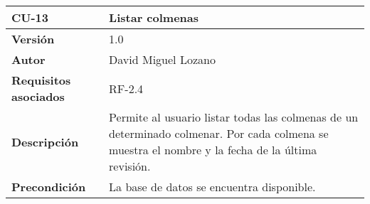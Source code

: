 \begin{longtable}[H]{@{}ll@{}}
\toprule
\begin{minipage}[b]{0.26\columnwidth}\raggedright\strut
\textbf{CU-13}\strut
\end{minipage} & \begin{minipage}[b]{0.68\columnwidth}\raggedright\strut
\textbf{Listar colmenas}\strut
\end{minipage}\tabularnewline
\midrule
\endhead
\begin{minipage}[t]{0.26\columnwidth}\raggedright\strut
\textbf{Versión}\strut
\end{minipage} & \begin{minipage}[t]{0.68\columnwidth}\raggedright\strut
1.0\strut
\end{minipage}\tabularnewline
\begin{minipage}[t]{0.26\columnwidth}\raggedright\strut
\textbf{Autor}\strut
\end{minipage} & \begin{minipage}[t]{0.68\columnwidth}\raggedright\strut
David Miguel Lozano\strut
\end{minipage}\tabularnewline
\begin{minipage}[t]{0.26\columnwidth}\raggedright\strut
\textbf{Requisitos asociados}\strut
\end{minipage} & \begin{minipage}[t]{0.68\columnwidth}\raggedright\strut
RF-2.4\strut
\end{minipage}\tabularnewline
\begin{minipage}[t]{0.26\columnwidth}\raggedright\strut
\textbf{Descripción}\strut
\end{minipage} & \begin{minipage}[t]{0.68\columnwidth}\raggedright\strut
Permite al usuario listar todas las colmenas de un determinado colmenar.
Por cada colmena se muestra el nombre y la fecha de la última
revisión.\strut
\end{minipage}\tabularnewline
\begin{minipage}[t]{0.26\columnwidth}\raggedright\strut
\textbf{Precondición}\strut
\end{minipage} & \begin{minipage}[t]{0.68\columnwidth}\raggedright\strut
La base de datos se encuentra disponible.


\end{minipage}
\end{longtable}
